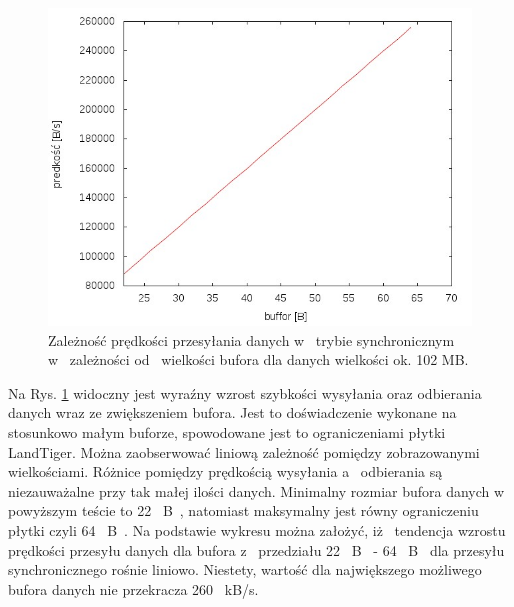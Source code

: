 \documentclass{BscUS}
\begin{document}
\newline
\begin{figure}[H]
{
\centering
\captionsetup{justification=centering}
\includegraphics[width=1\textwidth]{./img/S_107374200Receive}
\caption{Zależność prędkości przesyłania danych w~ trybie synchronicznym w~ zależności od~ wielkości bufora dla danych wielkości ok. 102 MB.}
\label{fig:S_107374200Receive}
}
\end{figure}
\noindent Na Rys. \ref{fig:S_107374200Receive} widoczny jest wyraźny wzrost szybkości wysyłania oraz odbierania danych wraz ze zwiększeniem bufora. Jest to doświadczenie wykonane na stosunkowo małym buforze, spowodowane jest to ograniczeniami płytki LandTiger. Można zaobserwować liniową zależność pomiędzy zobrazowanymi wielkościami. Różnice pomiędzy prędkością wysyłania a~ odbierania są niezauważalne przy tak małej ilości danych. Minimalny rozmiar bufora danych w powyższym teście to 22~ B~, natomiast maksymalny jest równy ograniczeniu płytki czyli 64~ B~. Na podstawie wykresu można założyć, iż~ tendencja wzrostu prędkości przesyłu danych dla bufora z~ przedziału 22~ B~ - 64~ B~ dla przesyłu synchronicznego rośnie liniowo. Niestety, wartość dla największego możliwego bufora danych nie przekracza 260~ kB/s. 
\end{document}
